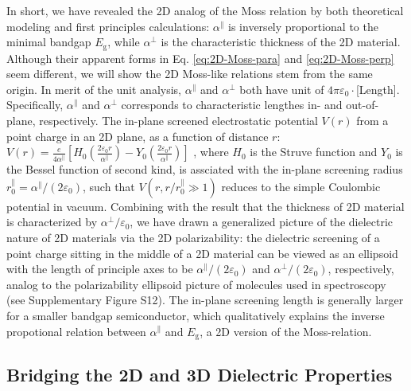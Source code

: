 \documentclass[journal=ancac3,manuscript=article,email=true,hyperref=true,keywords=false]{achemso}
\begin{document}
In short, we have revealed the 2D analog of the Moss relation by both
theoretical modeling and first principles calculations:
$\alpha^{\parallel}$ is inversely proportional to the minimal bandgap
$E_{\mathrm{g}}$, while $\alpha^{\perp}$ is the characteristic
thickness of the 2D material. Although their apparent forms in
Eq. \ref{eq:2D-Moss-para} and \ref{eq:2D-Moss-perp} seem different, we
will show the 2D Moss-like relations stem from the same origin. In
merit of the unit analysis, $\alpha^{\parallel}$ and $\alpha^{\perp}$
both have unit of $4\pi\varepsilon_{0} \cdot$[Length]. Specifically,
$\alpha^{\parallel}$ and $\alpha^{\perp}$ corresponds to
characteristic lengthes in- and out-of-plane, respectively. The
in-plane screened electrostatic potential $V(r)$ from a point charge
in an 2D plane, as a function of distance $r$:
$V(r) = {\displaystyle \frac{e}{4 \alpha^{\parallel}}}
\left[H_{0}({\displaystyle \frac{2\varepsilon_{0}
      r}{\alpha^{\parallel}}}) - Y_{0}( {\displaystyle \frac{2
      \varepsilon_{0}r}{\alpha^{\parallel}}})\right]$
\cite{Keldysh_1979_eps_multi,Pulci_2014}, where $H_{0}$ is the Struve
function and $Y_{0}$ is the Bessel function of second kind, is
assciated with the in-plane screening radius
$r_{0}^{\parallel}=\alpha^{\parallel}/(2 \varepsilon_{0})$, such that
$V(r,r/r^{\parallel}_{0} \gg 1)$ reduces to the simple Coulombic
potential in vacuum. Combining with the result that the thickness of
2D material is characterized by $\alpha^{\perp}/\varepsilon_{0}$, we
have drawn a generalized picture of the dielectric nature of 2D
materials via the 2D polarizability: the dielectric screening of a
point charge sitting in the middle of a 2D material can be viewed as
an ellipsoid with the length of principle axes to be
$\alpha^{\parallel}/(2 \varepsilon_{0})$ and
$\alpha^{\perp}/(2 \varepsilon_{0})$, respectively, analog to the
polarizability ellipsoid picture of molecules used in spectroscopy
\cite{Banwell_1994} (see Supplementary Figure S12). The in-plane
screening length is generally larger for a smaller bandgap
semiconductor, which qualitatively explains the inverse propotional
relation between $\alpha^{\parallel}$ and $E_{\mathrm{g}}$, a 2D
version of the Moss-relation.


\subsection{Bridging the 2D and 3D Dielectric Properties}
\label{sec:2D-3D}
\end{document}
